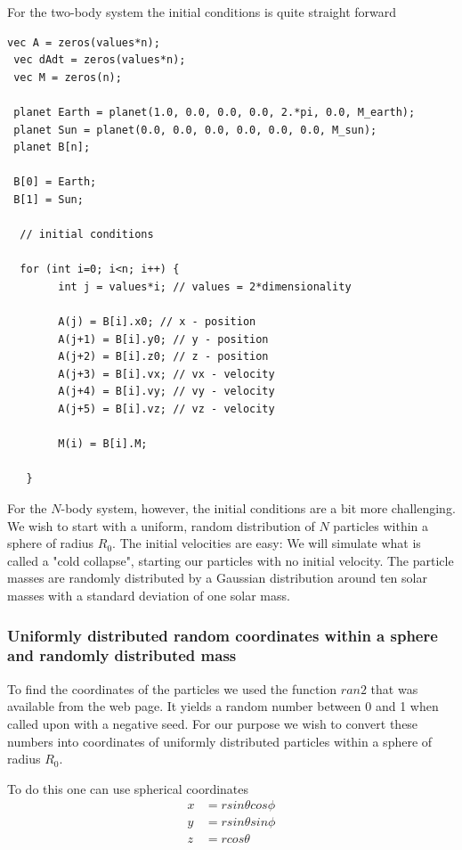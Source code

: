 \documentclass[a4paper,12pt, english]{article}
\begin{document}
For the two-body system the initial conditions is quite straight forward

 \begin{lstlisting}[title={Initial conditions two-body system}]
 vec A = zeros(values*n);
 vec dAdt = zeros(values*n);
 vec M = zeros(n);

 planet Earth = planet(1.0, 0.0, 0.0, 0.0, 2.*pi, 0.0, M_earth);
 planet Sun = planet(0.0, 0.0, 0.0, 0.0, 0.0, 0.0, M_sun);
 planet B[n];

 B[0] = Earth;
 B[1] = Sun;

  // initial conditions

  for (int i=0; i<n; i++) {
        int j = values*i; // values = 2*dimensionality
       
        A(j) = B[i].x0; // x - position
        A(j+1) = B[i].y0; // y - position
        A(j+2) = B[i].z0; // z - position
        A(j+3) = B[i].vx; // vx - velocity
        A(j+4) = B[i].vy; // vy - velocity
        A(j+5) = B[i].vz; // vz - velocity

        M(i) = B[i].M;
        
   }
\end{lstlisting}
 
 
For the $N$-body system, however, the initial conditions are a bit more challenging. We wish to start with a uniform, random distribution of $N$ particles within a sphere of radius $R_0$. The initial velocities are easy: We will simulate what is called a "cold collapse", starting our particles with no initial velocity. The particle masses are randomly distributed by a Gaussian distribution around ten solar masses with a standard deviation of one solar mass.


\subsubsection*{Uniformly distributed random coordinates within a sphere and randomly distributed mass}

To find the coordinates of the particles we used the function $ran2$ that was available from the web page. It yields a random number between 0 and 1 when called upon with a negative seed. For our purpose we wish to convert these numbers into coordinates of uniformly distributed particles within a sphere of radius $R_0$.

To do this one can use spherical coordinates
\begin{equation}
\begin{split}
x &= r sin \theta cos \phi \\
y &= r sin \theta sin \phi \\
z &= r cos \theta
\end{split}
\end{equation}
\end{document}
